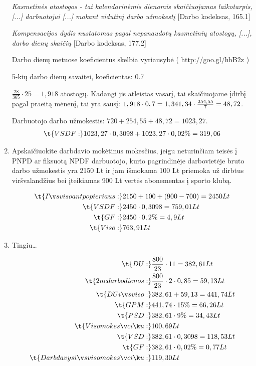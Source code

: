 \begin{enumerate}
{		\textit{Kasmetinės atostogos - tai kalendorinėmis dienomis
		skaičiuojamas laikotarpis, [...] darbuotojui [...] mokant
		vidutinį darbo užmokestį} [Darbo kodeksas, 165.1]
		
		\textit{Kompensacijos dydis nustatomas pagal nepanaudotų
		kasmetinių atostogų, [...], darbo dienų skaičių} [Darbo kodeksas, 177.2]
		
		Darbo dienų metuose koeficientus skelbia vyriausybė ( http://goo.gl/hbB2z )
		
		5-kių darbo dienų savaitei, koeficientas: 0.7
	}    
    $\frac{28}{365} \cdot 25 = 1,918$
    atostogų. Kadangi jis atleistas vasarį, tai skaičiuojame įdirbį
    pagal praeitą mėnenį, tai yra sausį:
    $1,918 \cdot 0,7 = 1,34 \\
    1,34 \cdot \frac{254,55}{7} = 48,72$.

    Darbuotojo darbo užmokestis: $720 + 254,55 + 48,72 = 1023,27$.
    \begin{align*}
      \t{VSDF:} & 1023,27 \cdot 0,3098 + 1023,27 \cdot 0,02\% = 319,06 \\
    \end{align*}

  \item Apskaičiuokite darbdavio mokėtinus mokesčius, jeigu neturinčiam
    teisės į PNPD ar fiksuotą NPDF darbuotojo, kurio pagrindinėje
    darbovietėje bruto darbo užmokestis yra 2150 Lt ir jam išmokama
    100 Lt priemoka už dirbtus viršvalandžius bei įteikiamas 900 Lt
    vertės abonementas į sporto klubą.

    \begin{align*}
      \t{Iš viso ant popieriaus: } & 2150 + 100 + (900 - 700) = 2450 Lt \\
      \t{VSDF:} & 2450 \cdot 0,3098 = 759,01 Lt \\
      \t{GF:} & 2450 \cdot 0,2 \% = 4,9 Lt \\
      \t{Viso:} & 763,91 Lt \\
    \end{align*}

  \item Tingiu…

    \begin{align*}
      \t{DU:} & \frac{800}{23} \cdot 11 = 382,61 Lt \\
      \t{2 nedarbo dienos:} &
        \frac{800}{23} \cdot 2 \cdot 0,85 = 59,13 Lt \\
      \t{DU iš viso:} & 382,61 + 59,13 = 441,74 Lt \\
      \t{GPM:} & 441,74 \cdot 15\% = 66,26 Lt \\
      \t{PSD:} & 382,61 \cdot 9\% = 34,43 Lt \\
      \t{Viso mokesčių:} & 100,69 Lt \\
      \t{VSD:} & 382,61 \cdot 0,3098 = 118,53 Lt \\
      \t{GF:} & 382,61 \cdot 0,02 \% = 0,77 Lt \\
      \t{Darbdavys iš viso mokesčių:} & 119,30 Lt \\
    \end{align*}


\end{enumerate}
